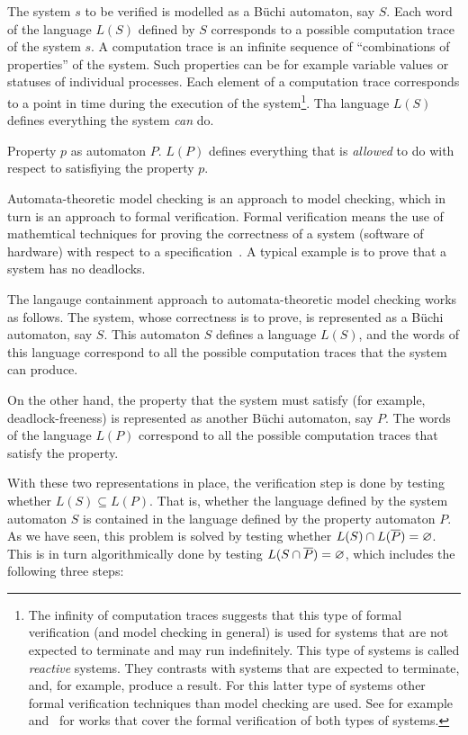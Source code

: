 The system $s$ to be verified is modelled as a Büchi automaton, say $S$. Each word of the language $L(S)$ defined by $S$ corresponds to a possible computation trace of the system $s$. A computation trace is an infinite sequence of ``combinations of properties'' of the system. Such properties can be for example variable values or statuses of individual processes. Each element of a computation trace corresponds to a point in time during the execution of the system\footnote{The infinity of computation traces suggests that this type of formal verification (and model checking in general) is used for systems that are not expected to terminate and  may run indefinitely. This type of systems is called \textit{reactive} systems. They contrasts with systems that are expected to terminate, and, for example, produce a result. For this latter type of systems other formal verification techniques than model checking are used. See for example~\cite{huth2004logic} and~\cite{ben2012mathematical} for works that cover the formal verification of both types of systems.}. Tha language $L(S)$ defines everything the system \textit{can} do.

Property $p$ as automaton $P$. $L(P)$ defines everything that is \textit{allowed} to do with respect to satisfiying the property $p$.


Automata-theoretic model checking is an approach to model checking, which in turn is an approach to formal verification. Formal verification means the use of mathemtical techniques for proving the correctness of a system (software of hardware) with respect to a specification~\cite{2007_vardi_model_checking}. A typical example is to prove that a system has no deadlocks.

The langauge containment approach to automata-theoretic model checking works as follows. The system, whose correctness is to prove, is represented as a Büchi automaton, say $S$. This automaton $S$ defines a language $L(S)$, and the words of this language correspond to all the possible computation traces that the system can produce.

On the other hand, the property that the system must satisfy (for example, deadlock-freeness) is represented as another Büchi automaton, say $P$. The words of the language $L(P)$ correspond to all the possible computation traces that satisfy the property.

With these two representations in place, the verification step is done by testing whether $L(S) \subseteq L(P)$. That is, whether the language defined by the system automaton $S$ is contained in the language defined by the property automaton $P$. As we have seen, this problem is solved by testing whether $L(S) \cap L(\cl1{P}) = \varnothing$. This is in turn algorithmically done by testing $L(S \cap \cl1{P}) = \varnothing$, which includes the following three steps:

